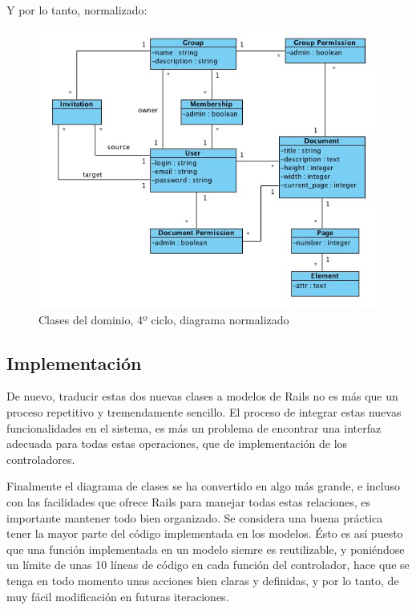 Y por lo tanto, normalizado:

\begin{figure}[h!]
\centering
\includegraphics[width=14cm]{uml4n.png}
\caption{Clases del dominio, 4º ciclo, diagrama normalizado}\label{fig:uml4n}
\end{figure}


\subsection{Implementación} %
\label{sub:implementación}

De nuevo, traducir estas dos nuevas clases a modelos de Rails no es más que un proceso repetitivo y tremendamente sencillo. El proceso de integrar estas nuevas funcionalidades en el sistema, es más un problema de encontrar una interfaz adecuada para todas estas operaciones, que de implementación de los controladores.

Finalmente el diagrama de clases se ha convertido en algo más grande, e incluso con las facilidades que ofrece Rails para manejar todas estas relaciones, es importante mantener todo bien organizado. Se considera una buena práctica tener la mayor parte del código implementada en los modelos. Ésto es así puesto que una función implementada en un modelo siemre es reutilizable, y poniéndose un límite de unas 10 líneas de código en cada función del controlador, hace que se tenga en todo momento unas acciones bien claras y definidas, y por lo tanto, de muy fácil modificación en futuras iteraciones.

